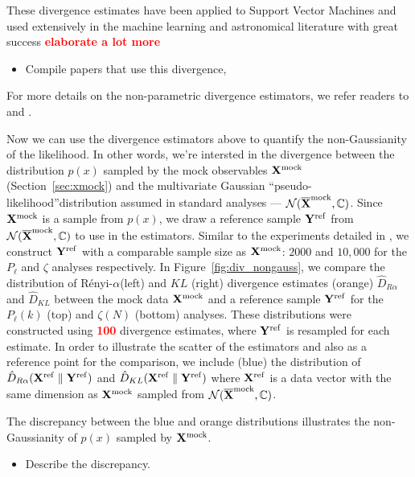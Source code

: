 \documentclass[12pt, letterpaper, preprint]{aastex}
\newcommand{\bitem}{\begin{itemize}}
\newcommand{\eitem}{\end{itemize}}
\newcommand{\todo}[1]{{\bf \textcolor{red}{#1}}}
\newcommand{\Xmock}{{\bf X}^\mathrm{mock}}
\newcommand{\Xref}{{\bf X}^\mathrm{ref}}
\newcommand{\Yref}{{\bf Y}^\mathrm{ref}}
\newcommand{\Ralpha}{R\'enyi-$\alpha$}
\begin{document}
These divergence estimates have been applied to Support Vector Machines and used 
extensively in the machine learning and astronomical literature with great success 
\todo{elaborate a lot more} 
\bitem 
    \item Compile papers that use this divergence, \cite{ntampaka2015, ntampaka2016}
\eitem
For more details on the non-parametric divergence estimators, we refer readers to 
\cite{poczos2012} and \cite{krishnamurthy2014}.

Now we can use the divergence estimators above to quantify the non-Gaussianity 
of the likelihood. In other words, we're intersted in the divergence between
the distribution $p(x)$ sampled by the mock observables $\Xmock$ (Section~\ref{sec:xmock})
and the multivariate Gaussian ``pseudo-likelihood''distribution assumed in 
standard analyses --- $\mathcal{N}(\overline{\bf X}^\mathrm{mock}, \mathbb{C})$. Since
$\Xmock$ is a sample from $p(x)$, we draw a reference sample 
${\bf Y}^\mathrm{ref}$ from $\mathcal{N}(\overline{\bf X}^\mathrm{mock}, \mathbb{C})$ 
to use in the estimators. Similar to the experiments detailed in \cite{poczos2012}, 
we construct ${\bf Y}^\mathrm{ref}$ with a comparable sample size as $\Xmock$: 
$2000$ and $10,000$ for the $P_\ell$ and $\zeta$ analyses respectively. 
In Figure~\ref{fig:div_nongauss}, we compare the distribution of 
\Ralpha (left) and $KL$ (right) divergence estimates (orange)
$\hat{D}_{R\alpha}$ and $\hat{D}_{KL}$
between the mock data ${\bf X}^\mathrm{mock}$ and a reference sample 
${\bf Y}^\mathrm{ref}$ for the $P_\ell(k)$ (top) and $\zeta(N)$ (bottom) analyses.
These distributions were constructed using \todo{100} divergence estimates, 
where $\Yref$ is resampled for each estimate. In order to illustrate the scatter of the estimators and also  
as a reference point for the comparison, we include (blue) 
the distribution of $\hat{D}_{R\alpha}(\Xref \parallel \Yref)$ 
and $\hat{D}_{KL}(\Xref \parallel \Yref)$ where $\Xref$ is a data vector
with the same dimension as $\Xmock$ sampled from $\mathcal{N}(\overline{\bf X}^\mathrm{mock}, \mathbb{C})$.

The discrepancy between the blue and orange distributions illustrates the
non-Gaussianity of $p(x)$ sampled by ${\bf X}^\mathrm{mock}$. 
\bitem 
    \item Describe the discrepancy. 
\eitem
\end{document}
